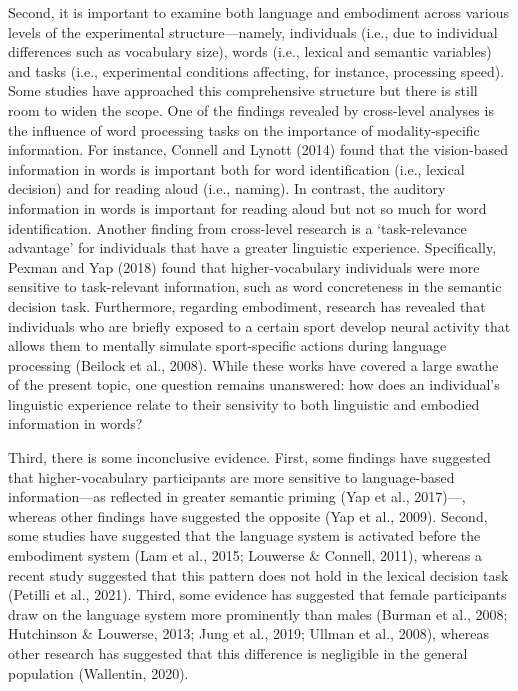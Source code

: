 \documentclass[
  12pt,
  man,floatsintext]{apa7}
\begin{document}
Second, it is important to examine both language and embodiment across various levels of the experimental structure---namely, individuals (i.e., due to individual differences such as vocabulary size), words (i.e., lexical and semantic variables) and tasks (i.e., experimental conditions affecting, for instance, processing speed). Some studies have approached this comprehensive structure but there is still room to widen the scope. One of the findings revealed by cross-level analyses is the influence of word processing tasks on the importance of modality-specific information. For instance, Connell and Lynott (2014) found that the vision-based information in words is important both for word identification (i.e., lexical decision) and for reading aloud (i.e., naming). In contrast, the auditory information in words is important for reading aloud but not so much for word identification. Another finding from cross-level research is a `task-relevance advantage' for individuals that have a greater linguistic experience. Specifically, Pexman and Yap (2018) found that higher-vocabulary individuals were more sensitive to task-relevant information, such as word concreteness in the semantic decision task. Furthermore, regarding embodiment, research has revealed that individuals who are briefly exposed to a certain sport develop neural activity that allows them to mentally simulate sport-specific actions during language processing (Beilock et al., 2008). While these works have covered a large swathe of the present topic, one question remains unanswered: how does an individual's linguistic experience relate to their sensivity to both linguistic and embodied information in words?

Third, there is some inconclusive evidence. First, some findings have suggested that higher-vocabulary participants are more sensitive to language-based information---as reflected in greater semantic priming (Yap et al., 2017)---, whereas other findings have suggested the opposite (Yap et al., 2009). Second, some studies have suggested that the language system is activated before the embodiment system (Lam et al., 2015; Louwerse \& Connell, 2011), whereas a recent study suggested that this pattern does not hold in the lexical decision task (Petilli et al., 2021). Third, some evidence has suggested that female participants draw on the language system more prominently than males (Burman et al., 2008; Hutchinson \& Louwerse, 2013; Jung et al., 2019; Ullman et al., 2008), whereas other research has suggested that this difference is negligible in the general population (Wallentin, 2020).
\end{document}

